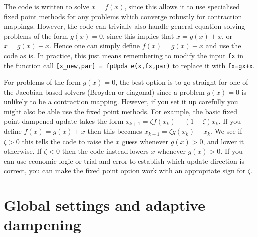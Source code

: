 \documentclass[a4paper,12pt]{article}
\newcommand{\code}[1]{\texttt{#1}}
\begin{document}
The code is written to solve $x=f(x)$, since this allows it to use specialised fixed point methods for any problems which converge robustly for contraction mappings. However, the code can trivially also handle general equation solving problems of the form $g(x) = 0$, since this implies that $x = g(x) + x$, or $x = g(x) - x$. Hence one can simply define $f(x) = g(x) + x$ and use the code as is. In practice, this just means remembering to modify the input \code{fx} in the function call \code{[x\_new,par] = fpUpdate(x,fx,par)} to replace it with \code{fx=gx+x}. 

For problems of the form $g(x)=0$, the best option is to go straight for one of the Jacobian based solvers (Broyden or diagonal) since a problem $g(x)=0$ is unlikely to be a contraction mapping. However, if you set it up carefully you might also be able use the fixed point methods. For example, the basic fixed point dampened update takes the form $x_{k+1} = \zeta f(x_k) + (1-\zeta) x_k$. If you define $f(x) = g(x) + x$ then this becomes $x_{k+1} = \zeta g(x_k) + x_k$. We see if $\zeta > 0$ this tells the code to raise the $x$ guess whenever $g(x)>0$, and lower it otherwise. If $\zeta < 0$ then the code instead lowers $x$ whenever $g(x) > 0$. If you can use economic logic or trial and error to establish which update direction is correct, you can make the fixed point option work with an appropriate sign for $\zeta$. 



\section{Global settings and adaptive dampening}
\end{document}
